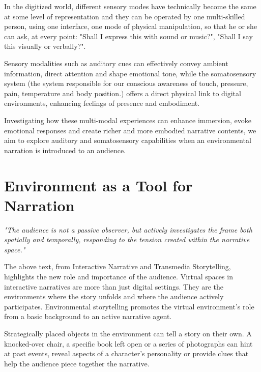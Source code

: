         In the digitized world, different sensory modes have technically become the same at some level of representation and they can be operated by one multi-skilled person, using one interface, one mode of physical manipulation, so that he or she can ask, at every point: "Shall I express this with sound or music?", "Shall I say this visually or verbally?"\cite{Multimodal_Discourse}.\par

        Sensory modalities such as auditory cues can effectively convey ambient information, direct attention and shape emotional tone, while the somatosensory system (the system responsible for our conscious awareness of touch, pressure, pain, temperature and body position\cite{Somatic_Sensory}.) offers a direct physical link to digital environments, enhancing feelings of presence and embodiment.\par

        Investigating how these multi-modal experiences can enhance immersion, evoke emotional responses and create richer and more embodied narrative contents, we aim to explore auditory and somatosensory capabilities when an environmental narration is introduced to an audience.\par
    \section{Environment as a Tool for Narration} 
        \emph{"The audience is not a passive observer, but actively investigates the frame both spatially and temporally, responding to the tension created within the narrative space."\cite{Transmedia_Storytelling}}

        The above text, from Interactive Narrative and Transmedia Storytelling, highlights the new role and importance of the audience. Virtual spaces in interactive narratives are more than just digital settings. They are the environments where the story unfolds and where the audience actively participates. Environmental storytelling promotes the virtual environment's role from a basic background to an active narrative agent.\par

        Strategically placed objects in the environment can tell a story on their own. A knocked-over chair, a specific book left open or a series of photographs can hint at past events, reveal aspects of a character's personality or provide clues that help the audience piece together the narrative\cite{Environmental_Storytelling_Blogpost}.\par 

